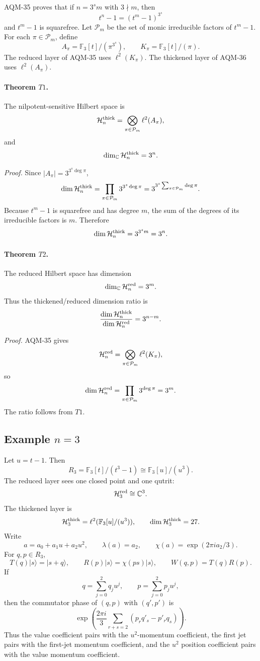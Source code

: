 AQM-35 proves that if \(n=3^s m\) with \(3\nmid m\), then
\[
  t^n-1=(t^m-1)^{3^s}
\]
and \(t^m-1\) is squarefree.  Let \(\mathcal P_m\) be the set of monic
irreducible factors of \(t^m-1\).  For each \(\pi\in\mathcal P_m\), define
\[
  A_\pi=\mathbb F_3[t]/(\pi^{3^s}),\qquad
  K_\pi=\mathbb F_3[t]/(\pi).
\]
The reduced layer of AQM-35 uses \(\ell^2(K_\pi)\).  The thickened layer of
AQM-36 uses \(\ell^2(A_\pi)\).

\paragraph{Theorem \(T1\).}
The nilpotent-sensitive Hilbert space is
\[
  \mathcal H_n^{\rm thick}
  =
  \bigotimes_{\pi\in\mathcal P_m}\ell^2(A_\pi),
\]
and
\[
  \dim_\mathbb C\mathcal H_n^{\rm thick}=3^n.
\]

\emph{Proof.}
Since \(|A_\pi|=3^{3^s\deg\pi}\),
\[
  \dim\mathcal H_n^{\rm thick}
  =
  \prod_{\pi\in\mathcal P_m}3^{3^s\deg\pi}
  =
  3^{3^s\sum_{\pi\in\mathcal P_m}\deg\pi}.
\]
Because \(t^m-1\) is squarefree and has degree \(m\), the sum of the degrees
of its irreducible factors is \(m\).  Therefore
\[
  \dim\mathcal H_n^{\rm thick}=3^{3^s m}=3^n.
\]

\paragraph{Theorem \(T2\).}
The reduced Hilbert space has dimension
\[
  \dim_\mathbb C\mathcal H_n^{\rm red}=3^m.
\]
Thus the thickened/reduced dimension ratio is
\[
  \frac{\dim\mathcal H_n^{\rm thick}}{\dim\mathcal H_n^{\rm red}}
  =
  3^{n-m}.
\]

\emph{Proof.}
AQM-35 gives
\[
  \mathcal H_n^{\rm red}
  =
  \bigotimes_{\pi\in\mathcal P_m}\ell^2(K_\pi),
\]
so
\[
  \dim\mathcal H_n^{\rm red}
  =
  \prod_{\pi\in\mathcal P_m}3^{\deg\pi}
  =
  3^m.
\]
The ratio follows from \(T1\).

\subsection{Example \texorpdfstring{\(n=3\)}{n=3}}

Let \(u=t-1\).  Then
\[
  R_3=\mathbb F_3[t]/(t^3-1)\cong\mathbb F_3[u]/(u^3).
\]
The reduced layer sees one closed point and one qutrit:
\[
  \mathcal H_3^{\rm red}\cong\mathbb C^3.
\]
The thickened layer is
\[
  \mathcal H_3^{\rm thick}=\ell^2(\mathbb F_3[u]/(u^3)),
  \qquad \dim\mathcal H_3^{\rm thick}=27.
\]
Write
\[
  a=a_0+a_1u+a_2u^2,\qquad
  \lambda(a)=a_2,\qquad
  \chi(a)=\exp(2\pi i a_2/3).
\]
For \(q,p\in R_3\),
\[
  T(q)|s\rangle=|s+q\rangle,\qquad
  R(p)|s\rangle=\chi(ps)|s\rangle,\qquad
  W(q,p)=T(q)R(p).
\]
If
\[
  q=\sum_{j=0}^2q_ju^j,\qquad p=\sum_{j=0}^2p_ju^j,
\]
then the commutator phase of \((q,p)\) with \((q',p')\) is
\[
  \exp\!\left(\frac{2\pi i}{3}
  \sum_{r+s=2}(p_rq'_s-p'_rq_s)\right).
\]
Thus the value coefficient pairs with the \(u^2\)-momentum coefficient, the
first jet pairs with the first-jet momentum coefficient, and the \(u^2\)
position coefficient pairs with the value momentum coefficient.


